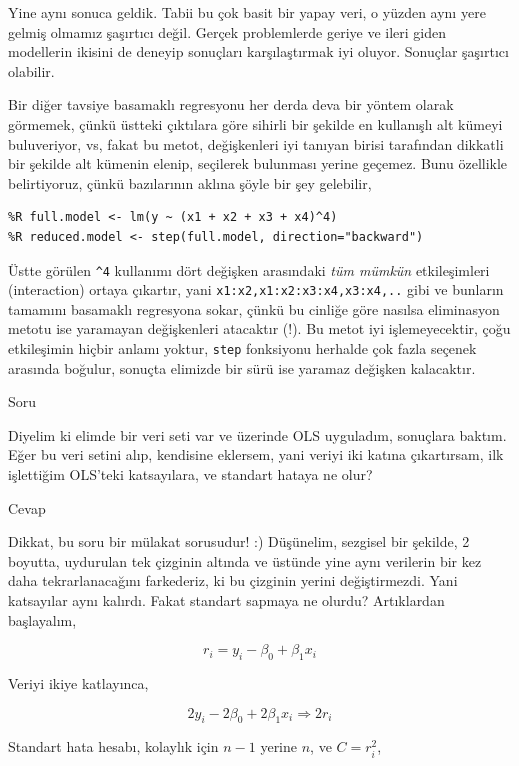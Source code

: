 \documentclass[12pt,fleqn]{article}\usepackage{../../common}
\begin{document}
Yine aynı sonuca geldik. Tabii bu çok basit bir yapay veri, o yüzden aynı yere
gelmiş olmamız şaşırtıcı değil. Gerçek problemlerde geriye ve ileri giden
modellerin ikisini de deneyip sonuçları karşılaştırmak iyi oluyor. Sonuçlar
şaşırtıcı olabilir.

Bir diğer tavsiye basamaklı regresyonu her derda deva bir yöntem olarak
görmemek, çünkü üstteki çıktılara göre sihirli bir şekilde en kullanışlı alt
kümeyi buluveriyor, vs, fakat bu metot, değişkenleri iyi tanıyan birisi
tarafından dikkatli bir şekilde alt kümenin elenip, seçilerek bulunması yerine
geçemez. Bunu özellikle belirtiyoruz, çünkü bazılarının aklına şöyle bir şey
gelebilir,

\begin{verbatim}
%R full.model <- lm(y ~ (x1 + x2 + x3 + x4)^4)
%R reduced.model <- step(full.model, direction="backward")
\end{verbatim}

Üstte görülen \verb!^4! kullanımı dört değişken arasındaki {\em tüm mümkün}
etkileşimleri (interaction) ortaya çıkartır, yani
\verb!x1:x2,x1:x2:x3:x4,x3:x4,..!  gibi ve bunların tamamını basamaklı
regresyona sokar, çünkü bu cinliğe göre nasılsa eliminasyon metotu ise yaramayan
değişkenleri atacaktır (!). Bu metot iyi işlemeyecektir, çoğu etkileşimin hiçbir
anlamı yoktur, \verb!step!  fonksiyonu herhalde çok fazla seçenek arasında
boğulur, sonuçta elimizde bir sürü ise yaramaz değişken kalacaktır.

Soru

Diyelim ki elimde bir veri seti var ve üzerinde OLS uyguladım, sonuçlara
baktım. Eğer bu veri setini alıp, kendisine eklersem, yani veriyi iki katına
çıkartırsam, ilk işlettiğim OLS'teki katsayılara, ve standart hataya ne olur?

Cevap 

Dikkat, bu soru bir mülakat sorusudur! :) Düşünelim, sezgisel bir şekilde, 2
boyutta, uydurulan tek çizginin altında ve üstünde yine aynı verilerin bir kez
daha tekrarlanacağını farkederiz, ki bu çizginin yerini değiştirmezdi. Yani
katsayılar aynı kalırdı. Fakat standart sapmaya ne olurdu? Artıklardan
başlayalım,

$$ r_i = y_i - \beta_0 + \beta_1x_i $$

Veriyi ikiye katlayınca, 

$$ 2y_i - 2\beta_0 + 2\beta_1x_i \Rightarrow 2r_i $$

Standart hata hesabı, kolaylık için $n-1$ yerine $n$, ve $C = r_i^2$,
\end{document}
